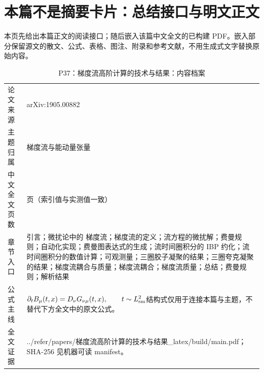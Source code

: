 \documentclass[UTF8,11pt,oneside]{ctexbook}
\begin{document}
\section*{本篇不是摘要卡片：总结接口与明文正文}
本页先给出本篇正文的阅读接口；随后嵌入该篇中文全文的已构建 PDF。嵌入部分保留源文的散文、公式、表格、图注、附录和参考文献，不用生成式文字替换原始内容。
\begin{table}[htbp]
  \centering
  \caption{P37：梯度流高阶计算的技术与结果：内容档案}
  \small
  \begin{tabularx}{0.96\textwidth}{@{}p{3.3cm}>{\raggedright\arraybackslash}X@{}}
    \toprule
    论文来源 & arXiv:1905.00882 \\
    主题归属 & 梯度流与能动量张量 \\
    中文全文页数 & 30 页（索引值与实测值一致） \\
    章节入口 & 引言；微扰论中的 梯度流；梯度流的定义；流方程的微扰解；费曼规则；自动化实现；费曼图表达式的生成；流时间圈积分的 IBP 约化；流时间圈积分的数值计算；可观测量；三圈胶子凝聚的结果；三圈夸克凝聚的结果；梯度流耦合与质量；梯度流耦合；梯度流质量；总结；费曼规则；解析结果 \\
    公式主线 & $\partial_t B_\mu(t,x)=D_\nu G_{\nu\mu}(t,x),\qquad t\sim L_{\rm sm}^{2}$\newline\scriptsize 结构式仅用于连接本篇与主题，不替代下方全文中的原文公式。 \\
    全文证据 & ../\allowbreak{}refer/\allowbreak{}papers/\allowbreak{}梯度流高阶计算的技术与结果\_\allowbreak{}latex/\allowbreak{}build/\allowbreak{}main.pdf；SHA-256 见机器可读 manifest。 \\
    \bottomrule
  \end{tabularx}
\end{table}
\end{document}
